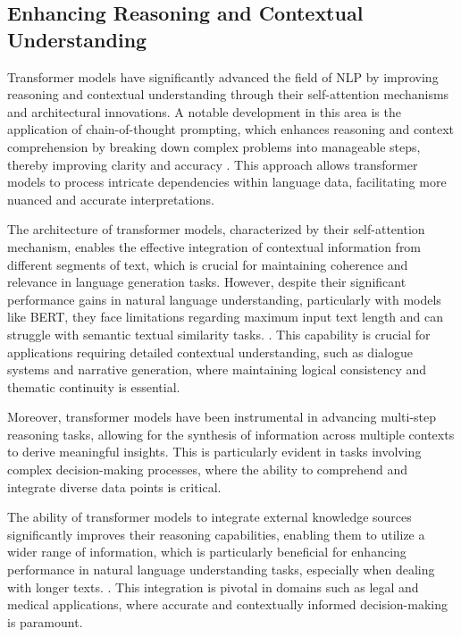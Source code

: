 \subsection{Enhancing Reasoning and Contextual Understanding} \label{subsec:Enhancing Reasoning and Contextual Understanding}

Transformer models have significantly advanced the field of NLP by improving reasoning and contextual understanding through their self-attention mechanisms and architectural innovations. A notable development in this area is the application of chain-of-thought prompting, which enhances reasoning and context comprehension by breaking down complex problems into manageable steps, thereby improving clarity and accuracy \cite{wei2022chain}. This approach allows transformer models to process intricate dependencies within language data, facilitating more nuanced and accurate interpretations.



The architecture of transformer models, characterized by their self-attention mechanism, enables the effective integration of contextual information from different segments of text, which is crucial for maintaining coherence and relevance in language generation tasks. However, despite their significant performance gains in natural language understanding, particularly with models like BERT, they face limitations regarding maximum input text length and can struggle with semantic textual similarity tasks. \cite{ginzburg2021selfsuperviseddocumentsimilarityranking,kasneci2023chatgpt}. This capability is crucial for applications requiring detailed contextual understanding, such as dialogue systems and narrative generation, where maintaining logical consistency and thematic continuity is essential.



Moreover, transformer models have been instrumental in advancing multi-step reasoning tasks, allowing for the synthesis of information across multiple contexts to derive meaningful insights. This is particularly evident in tasks involving complex decision-making processes, where the ability to comprehend and integrate diverse data points is critical.



The ability of transformer models to integrate external knowledge sources significantly improves their reasoning capabilities, enabling them to utilize a wider range of information, which is particularly beneficial for enhancing performance in natural language understanding tasks, especially when dealing with longer texts. \cite{ginzburg2021selfsuperviseddocumentsimilarityranking}. This integration is pivotal in domains such as legal and medical applications, where accurate and contextually informed decision-making is paramount.



